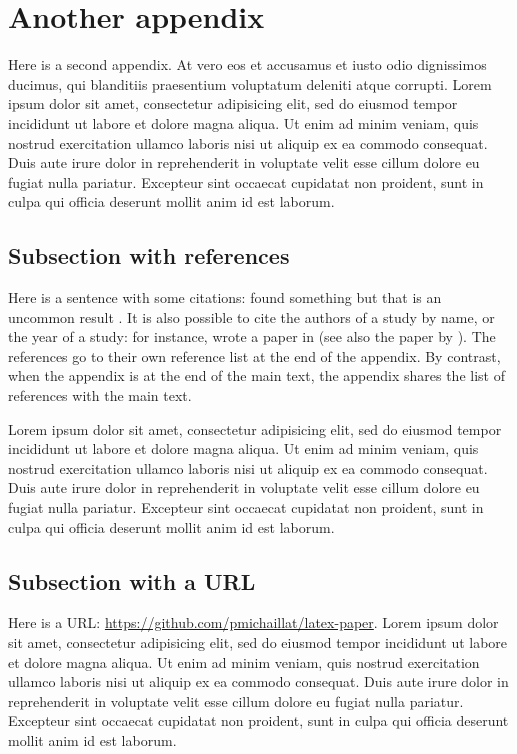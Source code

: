 \documentclass[letterpaper,11pt,leqno]{article}
\begin{document}
\section{Another appendix}\label{a:appendix2}

Here is a second appendix. At vero eos et accusamus et iusto odio dignissimos ducimus, qui blanditiis praesentium voluptatum deleniti atque corrupti. Lorem ipsum dolor sit amet, consectetur adipisicing elit, sed do eiusmod tempor incididunt ut labore et dolore magna aliqua. Ut enim ad minim veniam, quis nostrud exercitation ullamco laboris nisi ut aliquip ex ea commodo consequat. Duis aute irure dolor in reprehenderit in voluptate velit esse cillum dolore eu fugiat nulla pariatur. Excepteur sint occaecat cupidatat non
proident, sunt in culpa qui officia deserunt mollit anim id est laborum.

\subsection{Subsection with references}\label{a:subappendix}

Here is a sentence with some citations: \citet{MS19,MS21b} found something but that is an uncommon result \citep[chapter 5]{M12}. It is also possible to cite the authors of a study by name, or the year of a study: for instance, \citeauthor{EMM21} wrote a paper in \citeyear{EMM21} (see also the paper by \citealp{M14}). The references go to their own reference list at the end of the appendix. By contrast, when the appendix is at the end of the main text, the appendix shares the list of references with the main text. 

Lorem ipsum dolor sit amet, consectetur adipisicing elit, sed do eiusmod
tempor incididunt ut labore et dolore magna aliqua. Ut enim ad minim veniam,
quis nostrud exercitation ullamco laboris nisi ut aliquip ex ea commodo
consequat. Duis aute irure dolor in reprehenderit in voluptate velit esse
cillum dolore eu fugiat nulla pariatur. Excepteur sint occaecat cupidatat non
proident, sunt in culpa qui officia deserunt mollit anim id est laborum.

\subsection{Subsection with a URL}

Here is a URL: \url{https://github.com/pmichaillat/latex-paper}. Lorem ipsum dolor sit amet, consectetur adipisicing elit, sed do eiusmod
tempor incididunt ut labore et dolore magna aliqua. Ut enim ad minim veniam,
quis nostrud exercitation ullamco laboris nisi ut aliquip ex ea commodo
consequat. Duis aute irure dolor in reprehenderit in voluptate velit esse
cillum dolore eu fugiat nulla pariatur. Excepteur sint occaecat cupidatat non
proident, sunt in culpa qui officia deserunt mollit anim id est laborum.
\end{document}
